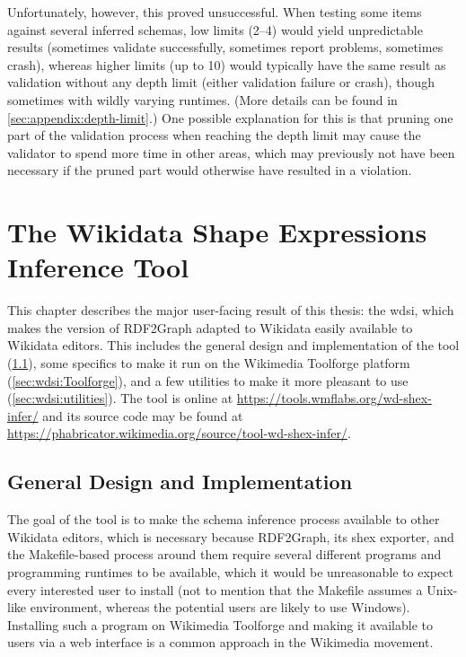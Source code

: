 Unfortunately, however, this proved unsuccessful.
When testing some \glspl{item} against several inferred \glspl{schema},
low limits (2–4) would yield unpredictable results
(sometimes validate successfully, sometimes report problems, sometimes crash),
whereas higher limits (up to 10) would typically have the same result as validation without any depth limit
(either validation failure or crash),
though sometimes with wildly varying runtimes.
(More details can be found in \cref{sec:appendix:depth-limit}.)
One possible explanation for this is that pruning one part of the validation process when reaching the depth limit
may cause the validator to spend more time in other areas,
which may previously not have been necessary if the pruned part would otherwise have resulted in a violation.

\chapter{The Wikidata Shape Expressions Inference Tool}
\label{ch:wdsi}

This chapter describes the major user-facing result of this thesis:
the \gls{wdsi},
which makes the version of \gls{RDF2Graph} adapted to \gls{Wikidata}
easily available to \gls{Wikidata} editors.
This includes the general design and implementation of the tool (\cref{sec:wdsi:abstract}),
some specifics to make it run on the \gls{Wikimedia Toolforge} platform (\cref{sec:wdsi:Toolforge}),
and a few utilities to make it more pleasant to use (\cref{sec:wdsi:utilities}).
The tool is online at \url{https://tools.wmflabs.org/wd-shex-infer/}
and its source code may be found at \url{https://phabricator.wikimedia.org/source/tool-wd-shex-infer/}.

\section{General Design and Implementation}
\label{sec:wdsi:abstract}

The goal of the tool is to make the \gls{schema} inference process available to other \gls{Wikidata} editors,
which is necessary because \gls{RDF2Graph}, its \gls{shex} exporter, and the Makefile-based process around them
require several different programs and programming runtimes to be available,
which it would be unreasonable to expect every interested user to install
(not to mention that the Makefile assumes a Unix-like environment,
whereas the potential users are likely to use Windows).
Installing such a program on \gls{Wikimedia Toolforge}
and making it available to users via a web interface
is a common approach in the \gls{Wikimedia} movement.


